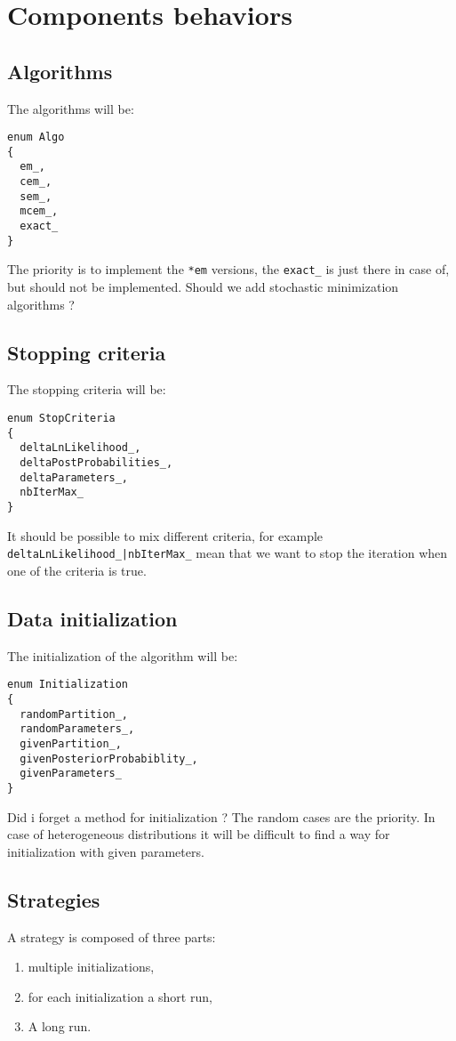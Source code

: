\documentclass[a4paper,11pt]{article}
\begin{document}
\section{Components behaviors}
\subsection{Algorithms}

The algorithms will be:
\begin{verbatim}
enum Algo
{
  em_,
  cem_,
  sem_,
  mcem_,
  exact_
}
\end{verbatim}

The priority is to implement the \verb+*em+ versions, the \verb+exact_+ is just there in case of, but
should not be implemented. Should we add stochastic minimization algorithms ?

\subsection{Stopping criteria}

The stopping criteria will be:
\begin{verbatim}
enum StopCriteria
{
  deltaLnLikelihood_,
  deltaPostProbabilities_,
  deltaParameters_,
  nbIterMax_
}
\end{verbatim}
It should be possible to mix different criteria, for example
\verb+deltaLnLikelihood_|nbIterMax_+ mean that we want to stop the iteration when one
of the criteria is true.

\subsection{Data initialization}

The initialization of the algorithm will be:
\begin{verbatim}
enum Initialization
{
  randomPartition_,
  randomParameters_,
  givenPartition_,
  givenPosteriorProbabiblity_,
  givenParameters_
}
\end{verbatim}

Did i forget a method for initialization ? The random cases are the priority.
In case of heterogeneous distributions it will be difficult to find a way for initialization with
given parameters.

\subsection{Strategies}

A strategy is composed of three parts:
\begin{enumerate}
  \item multiple initializations,
  \item for each initialization a short run,
  \item A long run.
\end{enumerate}
\end{document}
